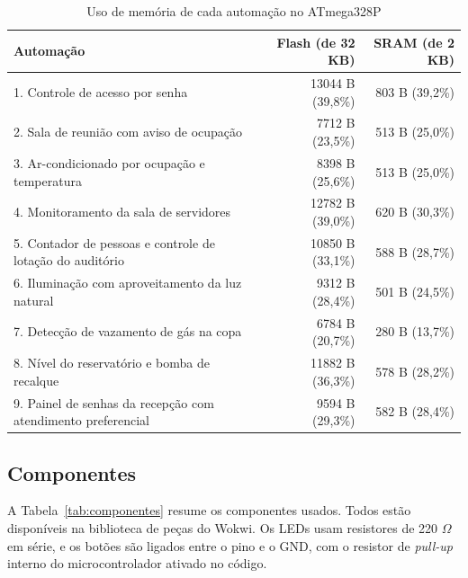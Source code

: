 \documentclass[12pt]{article}
\begin{document}
\begin{table}[!htb]
\centering
\caption{Uso de memória de cada automação no ATmega328P}\label{tab:memoria}
\small
\begin{tabularx}{\textwidth}{Xrr}
\toprule
Automação & Flash (de 32 KB) & SRAM (de 2 KB) \\
\midrule
1. Controle de acesso por senha & 13044 B (39,8\%) & 803 B (39,2\%) \\
2. Sala de reunião com aviso de ocupação & 7712 B (23,5\%) & 513 B (25,0\%) \\
3. Ar-condicionado por ocupação e temperatura & 8398 B (25,6\%) & 513 B (25,0\%) \\
4. Monitoramento da sala de servidores & 12782 B (39,0\%) & 620 B (30,3\%) \\
5. Contador de pessoas e controle de lotação do auditório & 10850 B (33,1\%) & 588 B (28,7\%) \\
6. Iluminação com aproveitamento da luz natural & 9312 B (28,4\%) & 501 B (24,5\%) \\
7. Detecção de vazamento de gás na copa & 6784 B (20,7\%) & 280 B (13,7\%) \\
8. Nível do reservatório e bomba de recalque & 11882 B (36,3\%) & 578 B (28,2\%) \\
9. Painel de senhas da recepção com atendimento preferencial & 9594 B (29,3\%) & 582 B (28,4\%) \\
\bottomrule
\end{tabularx}
\end{table}

\subsection{Componentes}

A Tabela~\ref{tab:componentes} resume os componentes usados. Todos estão disponíveis na biblioteca de peças do Wokwi. Os LEDs usam resistores de 220 $\Omega$ em série, e os botões são ligados entre o pino e o GND, com o resistor de \emph{pull-up} interno do microcontrolador ativado no código.
\end{document}
